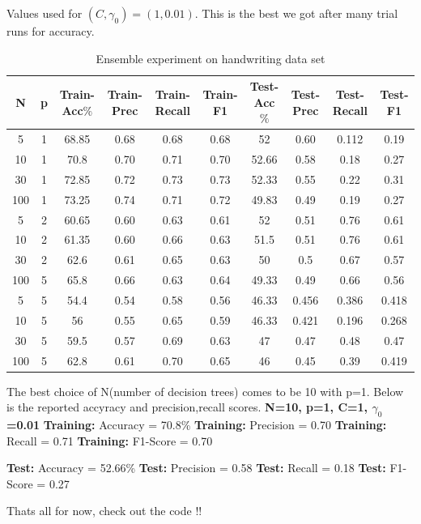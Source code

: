 \documentclass{article}
\begin{document}
  Values used for $(C,\gamma_0) = (1,0.01)$. This is the best we got after many trial runs for accuracy. \newline
 \begin{longtable}{c|c|c|c|c|c|c|c|c|c}
  \caption{Ensemble experiment on handwriting data set} \\
  \hline\hline
	  N & p & Train-Acc$\%$ & Train-Prec & Train-Recall & Train-F1 & Test-Acc$\%$ & Test-Prec & Test-Recall & Test-F1 \\[0.5ex]

  \hline
	 5 & 1 & 68.85 & 0.68 & 0.68 & 0.68 & 52 & 0.60 & 0.112 & 0.19 \\
	 10 & 1 & 70.8 & 0.70 & 0.71 & 0.70 & 52.66 & 0.58 & 0.18 & 0.27 \\
	 30 & 1 & 72.85 & 0.72 & 0.73 & 0.73 & 52.33 & 0.55 & 0.22 & 0.31 \\
	 100 & 1 & 73.25 & 0.74 & 0.71 & 0.72 & 49.83 & 0.49 & 0.19 & 0.27 \\
	 5 & 2 & 60.65 & 0.60 & 0.63 & 0.61 & 52 & 0.51 & 0.76 & 0.61 \\
	 10 & 2 & 61.35 & 0.60 & 0.66 & 0.63 & 51.5 & 0.51 & 0.76 & 0.61 \\
	 30 & 2 & 62.6 & 0.61 & 0.65 & 0.63 & 50 & 0.5 & 0.67 & 0.57 \\
	 100 & 5 & 65.8 & 0.66 & 0.63 & 0.64 & 49.33 & 0.49 & 0.66 & 0.56 \\
	 5 & 5 & 54.4 & 0.54 & 0.58 & 0.56 & 46.33 & 0.456 & 0.386 & 0.418 \\
	 10 & 5 & 56 & 0.55 & 0.65 & 0.59 & 46.33 & 0.421 & 0.196 & 0.268 \\
	 30 & 5 & 59.5 & 0.57 & 0.69 & 0.63 & 47 & 0.47 & 0.48 & 0.47 \\
	 100 & 5 & 62.8 & 0.61 & 0.70 & 0.65 & 46 & 0.45 & 0.39 & 0.419 \\ [0.5ex]
  \end{longtable}
  
   
   The best choice of N(number of decision trees) comes to be 10 with p=1. Below is the reported accyracy and precision,recall scores. \newline
     \textbf {N=10, p=1, C=1, $\gamma_0$=0.01} \newline
     \textbf {Training: } Accuracy = 70.8\% \newline
     \textbf {Training: } Precision = 0.70 \newline
     \textbf {Training: } Recall = 0.71 \newline
     \textbf {Training: } F1-Score = 0.70 \newline

     \textbf {Test: } Accuracy = 52.66\% \newline
     \textbf {Test: } Precision = 0.58 \newline
     \textbf {Test: } Recall = 0.18 \newline
     \textbf {Test: } F1-Score = 0.27 \newline
     
     Thats all for now, check out the code !!
\end{document}

